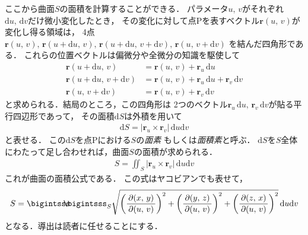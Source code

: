 ここから曲面$S$の面積を計算することができる．
パラメータ$u, \, v$がそれぞれ$\mathrm{d} u, \, \mathrm{d}v$だけ微小変化したとき，
その変化に対して点Pを表すベクトル$\bm{r}(u, \, v)$が変化し得る領域は，
4点$\bm{r}(u, \, v), \, \bm{r}(u + \mathrm{d}u, \, v), \, 
\bm{r} (u+ \mathrm{d}u, \, v+\mathrm{d}v), \, \bm{r} (u, \, v +\mathrm{d}v )$
を結んだ四角形である．
これらの位置ベクトルは偏微分や全微分の知識を駆使して
\begin{align*}
\bm{r} (u + \mathrm{d} u, \, v) & = \bm{r}(u, \, v) + \bm{r}_u \, \mathrm{d} u \\
\bm{r} ( u + \mathrm{d} u, \, v + \mathrm{d} v) & = 
\bm{r} (u, \, v)+ \bm{r}_u \, \mathrm{d} u + \bm{r}_v \, \mathrm{d} v \\ 
\bm{r} (u, \, v + \mathrm{d} v) & = \bm{r}(u, \, v) + \bm{r}_v \, \mathrm{d}v 
\end{align*}
と求められる．結局のところ，この四角形は
2つのベクトル$\bm{r}_u \, \mathrm{d}u, \, \bm{r}_v \, \mathrm{d}v$が貼る平行四辺形であって，
その面積$\mathrm{d}S$は外積を用いて
\begin{align}
\mathrm{d} S = \lvert \bm{r}_u \times \bm{r}_v \rvert \, \mathrm{d} u \mathrm{d}v
\label{eq:menso}
\end{align}
と表せる．
この$\mathrm{d}S$を点Pにおける$S$の\emph{面素}
もしくは\emph{面積素}と呼ぶ．
$\mathrm{d}S$を$S$全体にわたって足し合わせれば，曲面$S$の面積が求められる．
\begin{align}
S = \iint_S \lvert \bm{r}_u \times \bm{r}_v \rvert \, \mathrm{d} u \mathrm{d} v
\label{eq:kyokumenseki}
\end{align}
これが曲面の面積公式である．
この式はヤコビアンでも表せて，
\begin{align}
S = \bigintsss \! \! \! \! \! \bigintsss_S 
{ \sqrt{ \left( \frac{ \partial ( x, \, y) } {\partial (u, \, v) } \right) ^2
+ \left( \frac{ \partial ( y, \, z) } {\partial (u, \, v) } \right) ^2
+ \left( \frac{ \partial ( z, \, x) } {\partial (u, \, v) } \right) ^2 } \, \mathrm{d}u \mathrm{d}v }
\label{eq:kyokujacobian}
\end{align}
となる．導出は読者に任せることにする．
